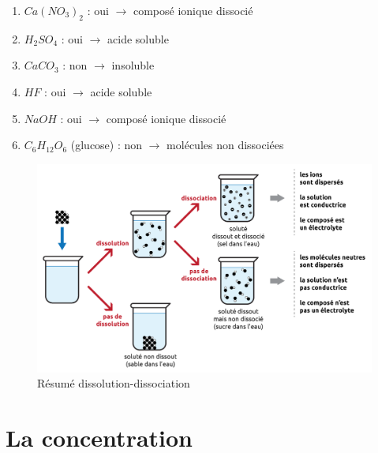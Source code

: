 \documentclass[
  11pt,
  a4paper,
  openany]{book}
\begin{document}
\begin{Answer}

\begin{enumerate}
\def\labelenumi{\arabic{enumi}.}
\item
  \(Ca(NO_3)_2\) : oui \(\rightarrow\) composé ionique dissocié
\item
  \(H_2SO_4\) : oui \(\rightarrow\) acide soluble
\item
  \(CaCO_3\) : non \(\rightarrow\) insoluble
\item
  \(HF\) : oui \(\rightarrow\) acide soluble
\item
  \(NaOH\) : oui \(\rightarrow\) composé ionique dissocié
\item
  \(C_6H_{12}O_6\) (glucose) : non \(\rightarrow\) molécules non dissociées
\end{enumerate}

\end{Answer}


\begin{figure}

{\centering \includegraphics[width=1\linewidth]{images/dissociation-resume} 

}

\caption{Résumé dissolution-dissociation}\label{fig:dissociation-resume}
\end{figure}

\newpage

\section{La concentration}\label{la-concentration}
\end{document}
